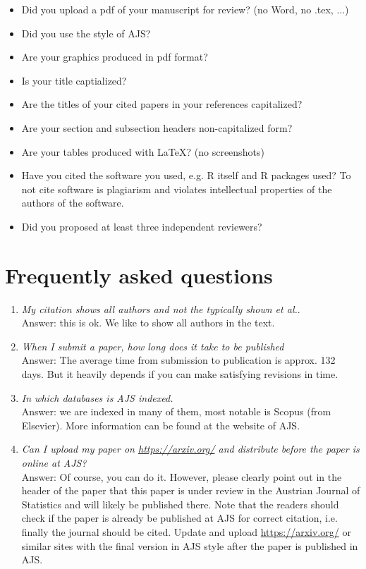 \documentclass[article]{ajs}
\begin{document}
\begin{itemize}
\item Did you upload a pdf of your manuscript for review? (no Word, no .tex, ...)
\item Did you use the style of AJS?  
\item Are your graphics produced in pdf format? 
\item Is your title captialized?
\item Are the titles of your cited papers in your references capitalized?
\item Are your section and subsection headers non-capitalized form?
\item Are your tables produced with \LaTeX ? (no screenshots)
\item Have you cited the software you used, e.g. R itself and R packages used? To not cite software is plagiarism and violates intellectual properties of the authors of the software.
\item Did you proposed at least three independent reviewers?
\end{itemize}

\section{Frequently asked questions}

\noindent 
\begin{enumerate}
\item \textit{My citation shows all authors and not the typically shown et al.}. \\ Answer: this is ok. We like to show all authors in the text.
\item \textit{When I submit a paper, how long does it take to be published} \\ Answer: The average time from submission to publication is approx. 132 days. But it heavily depends if you can make satisfying revisions in time. 
\item \textit{In which databases is AJS indexed.} \\
Answer: we are indexed in many of them, most notable is Scopus (from Elsevier). More information can be found at the website of AJS. 
\item \textit{Can I upload my paper on \href{https://arxiv.org/}{https://arxiv.org/} and distribute before the paper is online at AJS? } \\
Answer: Of course, you can do it. However, please clearly point out in the header of the paper that this paper is under review in the Austrian Journal of Statistics and will likely be published there. Note that the readers should check if the paper is already be published at AJS for correct citation, i.e. finally the journal should be cited. Update and upload  \href{https://arxiv.org/}{https://arxiv.org/} or similar sites with the final version in AJS style after the paper is published  in AJS. 

\end{enumerate}
\end{document}
